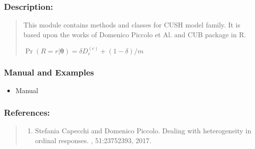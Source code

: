 \documentclass[letterpaper,10pt,english]{sphinxmanual}
\begin{document}
\subsubsection{Description:}
\label{\detokenize{cubmods:id115}}\begin{quote}

\sphinxAtStartPar
This module contains methods and classes
for CUSH model family.
It is based upon the works of Domenico
Piccolo et Al. and CUB package in R.

\sphinxAtStartPar
\(\Pr(R=r|\pmb \theta) = \delta D_r^{(c)} + (1 - \delta)/m\)
\end{quote}


\subsubsection{Manual and Examples}
\label{\detokenize{cubmods:id116}}\begin{itemize}
\item {} 
\sphinxAtStartPar
Manual 

\end{itemize}


\subsubsection{References:}
\label{\detokenize{cubmods:id117}}\begin{quote}
\begin{enumerate}
%
\setcounter{enumi}{0}
\item {} 
\sphinxAtStartPar
Stefania Capecchi and Domenico Piccolo. Dealing with heterogeneity in ordinal responses. , 51:2375\textendash{}2393, 2017.

\end{enumerate}
\end{quote}
\end{document}

